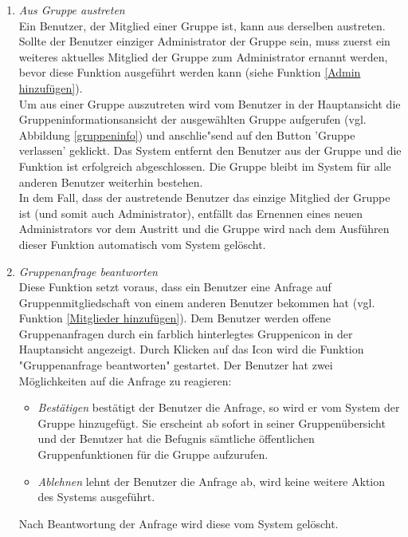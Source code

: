 \documentclass[parskip=full]{scrartcl}
\def\threedigits#1{%
  \ifnum#1<100 0\fi
  \ifnum#1<10 0\fi
  \number#1}
\begin{document}
\begin{enumerate}[label={\textbf{/F\protect\threedigits{\theenumi}0/}}, leftmargin=*, resume]
	
	\item \textit{Aus Gruppe austreten}\label{aus Gruppe austreten}\\
	Ein \gls{Benutzer}, der Mitglied einer Gruppe ist, kann aus derselben austreten. Sollte der Benutzer einziger Administrator der Gruppe sein, muss zuerst ein weiteres aktuelles Mitglied der Gruppe zum Administrator ernannt werden, bevor diese Funktion ausgeführt werden kann (siehe Funktion \ref{Admin hinzufügen}). \\
	Um aus einer Gruppe auszutreten wird vom Benutzer in der Hauptansicht die Gruppeninformationsansicht der ausgewählten Gruppe aufgerufen (vgl. Abbildung \ref{gruppeninfo}) und anschlie"send auf den Button 'Gruppe verlassen' geklickt. Das System entfernt den Benutzer aus der Gruppe und die Funktion ist erfolgreich abgeschlossen. Die Gruppe bleibt im System für alle anderen Benutzer weiterhin bestehen.\\
	In dem Fall, dass der austretende Benutzer das einzige Mitglied der Gruppe ist (und somit auch Administrator), entfällt das Ernennen eines neuen Administrators vor dem Austritt und die Gruppe wird nach dem Ausführen dieser Funktion automatisch vom System gelöscht.
	
	\item \textit{Gruppenanfrage beantworten}\label{Gruppenanfrage beantworten} \\
	Diese Funktion setzt voraus, dass ein Benutzer eine Anfrage auf Gruppenmitgliedschaft von einem anderen Benutzer bekommen hat (vgl. Funktion \ref{Mitglieder hinzufügen}). Dem Benutzer werden offene Gruppenanfragen durch ein farblich hinterlegtes Gruppenicon in der Hauptansicht angezeigt. Durch Klicken auf das Icon wird die Funktion "Gruppenanfrage beantworten" gestartet. Der Benutzer hat zwei Möglichkeiten auf die Anfrage zu reagieren:
	\begin{itemize}
		\item \textit{Bestätigen} bestätigt der Benutzer die Anfrage, so wird er vom System der Gruppe hinzugefügt. Sie erscheint ab sofort in seiner Gruppenübersicht und der Benutzer hat die Befugnis sämtliche öffentlichen Gruppenfunktionen für die Gruppe aufzurufen.
		\item \textit{Ablehnen} lehnt der Benutzer die Anfrage ab, wird keine weitere Aktion des Systems ausgeführt.
	\end{itemize}
Nach Beantwortung der Anfrage wird diese vom System gelöscht.
\end{enumerate}
\end{document}
